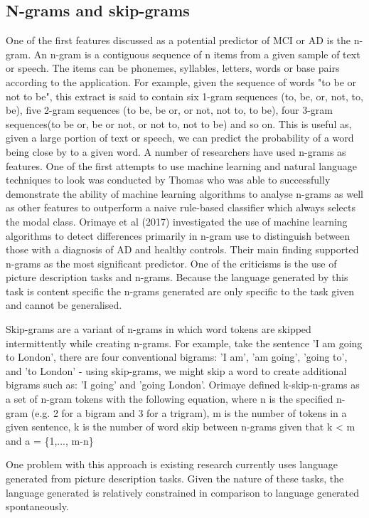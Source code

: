 \documentclass[10pt, letterpaper, twoside, openany]{thesis}
\begin{document}
\subsection{N-grams and skip-grams}
One of the first features discussed as a potential predictor of MCI or AD is the n-gram. An n-gram is a contiguous sequence of n items from a given sample of text or speech. The items can be phonemes, syllables, letters, words or base pairs according to the application. For example, given the sequence of words "to be or not to be", this extract is said to contain six 1-gram sequences (to, be, or, not, to, be), five 2-gram sequences (to be, be or, or not, not to, to be), four 3-gram sequences(to be or, be or not, or not to, not to be) and so on. This is useful as, given a large portion of text or speech, we can predict the probability of a word being close by to a given word. A number of researchers have used n-grams as features. One of the first attempts to use machine learning and natural language techniques to look was conducted by Thomas \cite{Thomas2005} who was able to successfully demonstrate the ability of machine learning algorithms to analyse n-grams as well as other features to outperform a naive rule-based classifier which always selects the modal class. Orimaye et al (2017) \cite{Orimaye2017} investigated the use of machine learning algorithms to detect differences primarily in n-gram use to distinguish between those with a diagnosis of AD and healthy controls. Their main finding supported n-grams as the most significant predictor. One of the criticisms is the use of picture description tasks and n-grams. Because the language generated by this task is content specific the n-grams generated are only specific to the task given and cannot be generalised. 
\par
Skip-grams are a variant of n-grams in which word tokens are skipped intermittently while creating n-grams. For example, take the sentence 'I am going to London', there are four conventional bigrams: 'I am', 'am going', 'going to', and 'to London' - using skip-grams, we might skip a word to create additional bigrams such as: 'I going' and 'going London'. 
Orimaye defined k-skip-n-grams as a set of n-gram tokens with the following equation, where n is the specified n-gram (e.g. 2 for a bigram and 3 for a trigram), m is the number of tokens in a given sentence, k is the number of word skip between n-grams given that k < m and a = \{1,..., m-n\}
\par 
One problem with this approach is existing research currently uses language generated from picture description tasks. Given the nature of these tasks, the language generated is relatively constrained in comparison to language generated spontaneously. 
\end{document}
